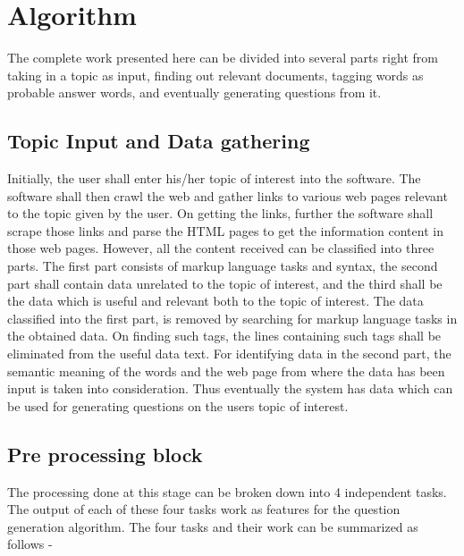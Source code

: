 %

\chapter{Algorithm}
The complete work presented here can be divided into several parts right from taking in a topic as input, finding out relevant documents, tagging words as probable answer words, and eventually generating questions from it. 

\section{Topic Input and Data gathering}

Initially, the user shall enter his/her topic of interest into the software. The software shall then crawl the web and gather links to various web pages relevant to the topic given by the user. On getting the links, further the software shall scrape those links and parse the HTML pages to get the information content in those web pages. 
However, all the content received can be classified into three parts. The first part consists of markup language tasks and syntax, the second part shall contain data unrelated to the topic of interest, and the third shall be the data which is useful and relevant both to the topic of interest. The data classified into the first part, is removed by searching for markup language tasks in the obtained data. On finding such tags, the lines containing such tags shall be eliminated from the useful data text. For identifying data in the second part, the semantic meaning of the words and the web page from where the data has been input is taken into consideration. Thus eventually the system has data which can be used for generating questions on the users topic of interest. 

\section{Pre processing block}
The processing done at this stage can be broken down into 4 independent tasks. The output of each of these four tasks work as features for the question generation algorithm. The four tasks and their work can be summarized as follows - 

